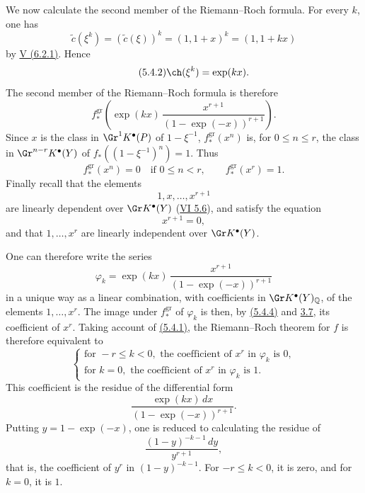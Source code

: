 We now calculate the second member of the Riemann--Roch formula. For every \(k\), one has
\[
 \widetilde c(\xi^k)=(\widetilde c(\xi))^k=(1,1+x)^k=(1,1+kx)
\]
by \hyperlink{sga6.e05.eq.6-2-1}{V (6.2.1)}. Hence
\begin{equation}\tag{5.4.2}
 \ch(\xi^k)=\exp(kx).
\end{equation}
The second member of the Riemann--Roch formula is therefore
\begin{equation}\tag{5.4.3}
 f^{\mathrm{gr}}_*\left(\exp(kx)\,
 \frac{x^{r+1}}{(1-\exp(-x))^{r+1}}\right).
\end{equation}
Since \(x\) is the class in \(\Gr^1K^{\bullet}(P)\) of \(1-\xi^{-1}\), \(f^{\mathrm{gr}}_*(x^n)\) is, for \(0\leq n\leq r\), the class in
\(\Gr^{n-r}K^{\bullet}(Y)\) of \(f_*((1-\xi^{-1})^n)=1\). Thus
\begin{equation}\tag{5.4.4}
 f^{\mathrm{gr}}_*(x^n)=0\quad\text{if }0\leq n<r,\qquad
 f^{\mathrm{gr}}_*(x^r)=1.
\end{equation}
Finally recall that the elements
\[
1,x,\ldots,x^{r+1}
\]
are linearly dependent over \(\Gr K^{\bullet}(Y)\) (\hyperlink{sga6.e06.cor.5-6}{VI 5.6}), and satisfy the equation
\begin{equation}\tag{5.4.5}
 x^{r+1}=0,
\end{equation}
and that \(1,\ldots,x^r\) are linearly independent over \(\Gr K^{\bullet}(Y)\).

One can therefore write the series
\[
\varphi_k=\exp(kx)\,
\frac{x^{r+1}}{(1-\exp(-x))^{r+1}}
\]
in a unique way as a linear combination, with coefficients in
\(\Gr K^{\bullet}(Y)_{\mathbb Q}\), of the elements \(1,\ldots,x^r\). The image under \(f^{\mathrm{gr}}_*\) of \(\varphi_k\) is then, by \hyperlink{sga6.e08.eq.5-4-4}{(5.4.4)} and \hyperlink{sga6.e08.prop.3-7}{3.7}, its coefficient of \(x^r\). Taking account of \hyperlink{sga6.e08.eq.5-4-1}{(5.4.1)}, the Riemann--Roch theorem for \(f\) is therefore equivalent to
\[
\left\{
\begin{array}{ll}
\text{for }-r\leq k<0,\text{ the coefficient of }x^r\text{ in }\varphi_k\text{ is }0,\\
\text{for }k=0,\text{ the coefficient of }x^r\text{ in }\varphi_k\text{ is }1.
\end{array}
\right.
\tag{RR}
\]
This coefficient is the residue of the differential form
\[
 \frac{\exp(kx)\,dx}{(1-\exp(-x))^{r+1}}.
\]
Putting \(y=1-\exp(-x)\), one is reduced to calculating the residue of
\[
 \frac{(1-y)^{-k-1}\,dy}{y^{r+1}},
\]
that is, the coefficient of \(y^r\) in \((1-y)^{-k-1}\). For \(-r\leq k<0\), it is zero, and for \(k=0\), it is \(1\).

